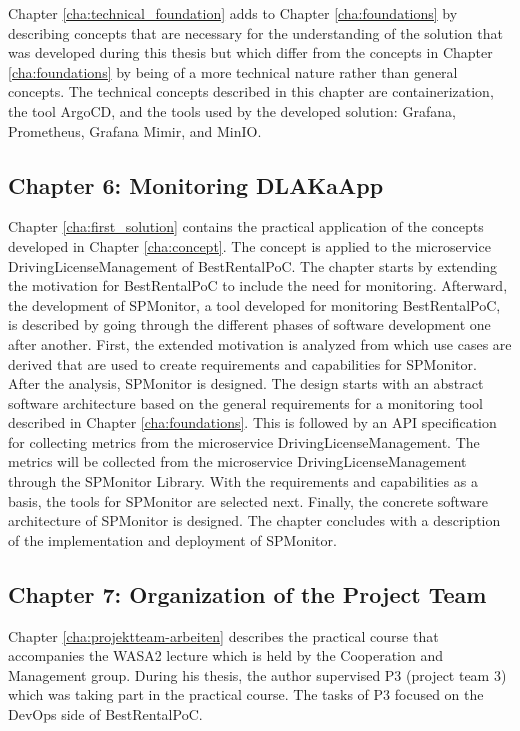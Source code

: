 Chapter \ref{cha:technical_foundation} adds to Chapter \ref{cha:foundations}
by describing concepts that are necessary for the understanding of the solution
that was developed during this thesis but which differ from the concepts in Chapter \ref{cha:foundations}
by being of a more technical nature rather than general concepts.
The technical concepts described in this chapter are containerization, the tool ArgoCD,
and the tools used by the developed solution: Grafana, Prometheus, Grafana Mimir, and MinIO.

\subsection*{Chapter 6: Monitoring DLAKaApp}

Chapter \ref{cha:first_solution} contains the practical application of the concepts
developed in Chapter \ref{cha:concept}. The concept is applied to the microservice
DrivingLicenseManagement of BestRentalPoC. The chapter starts by extending the motivation
for BestRentalPoC to include the need for monitoring. Afterward, the development
of SPMonitor, a tool developed for monitoring BestRentalPoC, is described by going through
the different phases of software development one after another. First, the extended
motivation is analyzed from which use cases are derived that are used to
create requirements and capabilities for SPMonitor. After the analysis,
SPMonitor is designed. The design starts with an abstract software architecture
based on the general requirements for a monitoring tool described in Chapter \ref{cha:foundations}.
This is followed by an API specification for collecting metrics from the microservice DrivingLicenseManagement.
The metrics will be collected from the microservice DrivingLicenseManagement through
the SPMonitor Library.
With the requirements and capabilities as a basis, the tools for SPMonitor are selected next.
Finally, the concrete software architecture of SPMonitor is designed.
The chapter concludes with a description of the implementation and deployment of SPMonitor.

\subsection*{Chapter 7: Organization of the Project Team}

Chapter \ref{cha:projektteam-arbeiten} describes the practical course
that accompanies the WASA2 lecture which is held by the Cooperation and Management group.
During his thesis, the author supervised P3 (project team 3) which was taking
part in the practical course. The tasks of P3 focused on the DevOps side of
BestRentalPoC.

